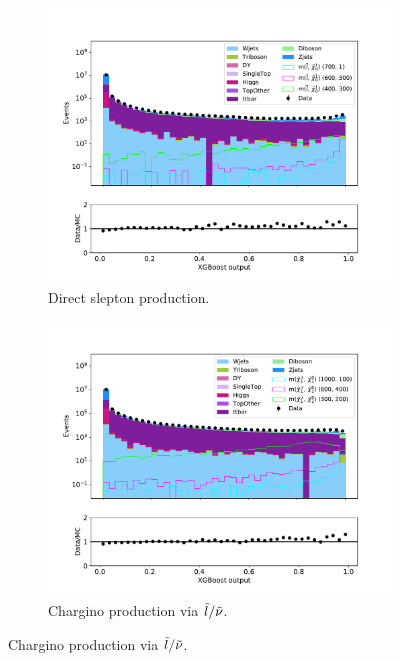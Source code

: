 \begin{figure}[H]
    \centering
    \begin{subfigure}[t!]{0.49\textwidth}
        \includegraphics[width = \textwidth]{Figures/Stacked/stackedplot_BDT_High_level_slepslep.pdf}
        \caption{Direct slepton production.}
        \label{fig:SlepslepNNLow}
    \end{subfigure}
    \begin{subfigure}[t!]{0.49\textwidth}
        \includegraphics[width = \textwidth]{Figures/Stacked/stackedplot_BDT_High_level_slepsnu.pdf}
        \caption{Chargino production via $\Tilde{l}/\Tilde{\nu}$.}

\end{subfigure}
\end{figure}
